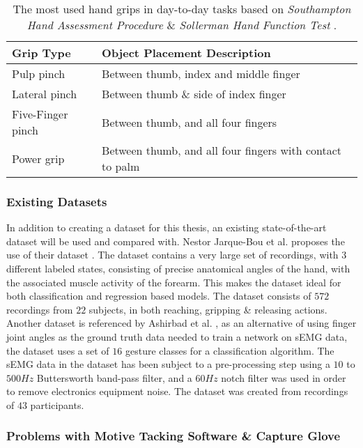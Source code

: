 \documentclass[../main.tex]{subfiles}
\begin{document}
\begin{table}[H]
\begin{center}
\begin{tabular}{ |l|l| } 
 \hline
 Grip Type & Object Placement Description \\ 
 \hline
 Pulp pinch & Between thumb, index and middle finger \\ 
 Lateral pinch & Between thumb \& side of index finger \\ 
 Five-Finger pinch & Between thumb, and all four fingers \\ 
 Power grip & Between thumb, and all four fingers with contact to palm \\ 
 \hline
\end{tabular}
\caption{The most used hand grips in day-to-day tasks based on \textit{Southampton Hand Assessment Procedure} \cite{shap} \& \textit{Sollerman Hand Function Test} \cite{sollerman}.}
\label{tab:grips}
\end{center}
\end{table}


\subsubsection{Existing Datasets}

In addition to creating a dataset for this thesis, an existing state-of-the-art dataset will be used and compared with.
Nestor Jarque-Bou et al. \cite{jarque2019} proposes the use of their dataset \cite{kinmusdataset}.
The dataset contains a very large set of recordings, with 3 different labeled states, consisting of precise anatomical angles of the hand, with the associated muscle activity of the forearm.
This makes the dataset ideal for both classification and regression based models.
The dataset consists of $572$ recordings from $22$ subjects, in both reaching, gripping \& releasing actions.
Another dataset is referenced by Ashirbad et al. \cite{ashirbad2022}, as an alternative of using finger joint angles as the ground truth data needed to train a network on sEMG data, the dataset uses a set of $16$ gesture classes for a classification algorithm.
The sEMG data in the dataset has been subject to a pre-processing step using a $10$ to $500Hz$ Buttersworth band-pass filter, and a $60Hz$ notch filter was used in order to remove electronics equipment noise.
The dataset was created from recordings of $43$ participants.

\subsubsection{Problems with Motive Tacking Software \& Capture Glove}
\label{sec:motiveproblems}
\end{document}
